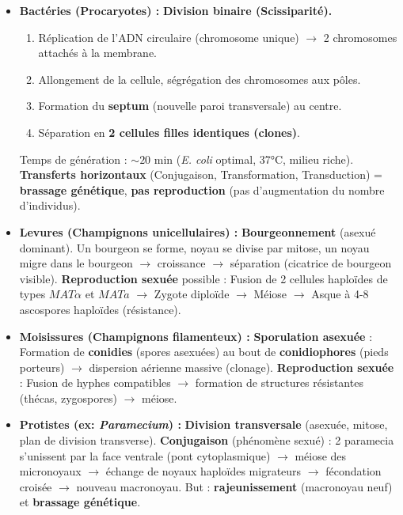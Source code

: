 \documentclass[11pt]{article}
\begin{document}
\begin{propriete}
    \begin{itemize}
        \item \textbf{Bactéries (Procaryotes) :} \textbf{Division binaire (Scissiparité).}
              \begin{enumerate}
                  \item Réplication de l'ADN circulaire (chromosome unique) $\rightarrow$ 2 chromosomes attachés à la membrane.
                  \item Allongement de la cellule, ségrégation des chromosomes aux pôles.
                  \item Formation du \textbf{septum} (nouvelle paroi transversale) au centre.
                  \item Séparation en \textbf{2 cellules filles identiques (clones)}.
              \end{enumerate}
              Temps de génération : $\sim 20$ min (\emph{E. coli} optimal, 37°C, milieu riche). \textbf{Transferts horizontaux} (Conjugaison, Transformation, Transduction) = \textbf{brassage génétique}, \textbf{pas reproduction} (pas d'augmentation du nombre d'individus).
        \item \textbf{Levures (Champignons unicellulaires) :} \textbf{Bourgeonnement} (asexué dominant). Un bourgeon se forme, noyau se divise par mitose, un noyau migre dans le bourgeon $\rightarrow$ croissance $\rightarrow$ séparation (cicatrice de bourgeon visible). \textbf{Reproduction sexuée} possible : Fusion de 2 cellules haploïdes de types $MAT\alpha$ et $MATa$ $\rightarrow$ Zygote diploïde $\rightarrow$ Méiose $\rightarrow$ Asque à 4-8 ascospores haploïdes (résistance).
        \item \textbf{Moisissures (Champignons filamenteux) :} \textbf{Sporulation asexuée} : Formation de \textbf{conidies} (spores asexuées) au bout de \textbf{conidiophores} (pieds porteurs) $\rightarrow$ dispersion aérienne massive (clonage). \textbf{Reproduction sexuée} : Fusion de hyphes compatibles $\rightarrow$ formation de structures résistantes (thécas, zygospores) $\rightarrow$ méiose.
        \item \textbf{Protistes (ex: \emph{Paramecium}) :} \textbf{Division transversale} (asexuée, mitose, plan de division transverse). \textbf{Conjugaison} (phénomène sexué) : 2 paramecia s'unissent par la face ventrale (pont cytoplasmique) $\rightarrow$ méiose des micronoyaux $\rightarrow$ échange de noyaux haploïdes migrateurs $\rightarrow$ fécondation croisée $\rightarrow$ nouveau macronoyau. But : \textbf{rajeunissement} (macronoyau neuf) et \textbf{brassage génétique}.

\end{itemize}
\end{propriete}
\end{document}
